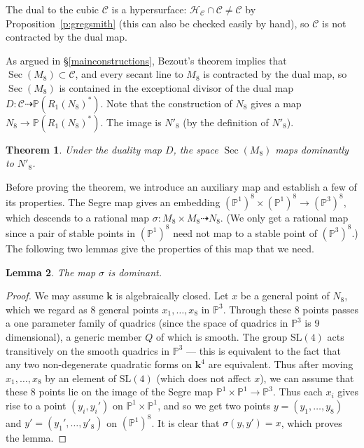 \documentclass{amsart}
\newtheorem{theorem}{Theorem}[section]
\newtheorem{lemma}[theorem]{Lemma}
\theoremstyle{definition}
\theoremstyle{remark}
\DeclareMathOperator{\Sec}{Sec}
\def\SL{\mathrm{SL}}
\def\fieldk{\mathbf{k}}
\def\P{\mathbb{P}}
\def\proj{\mathbb{P}}
\def\cubic{\mathcal{C}}
\def\hessian{\mathcal{H}}
\begin{document}
The dual to the cubic $\cubic$ is a hypersurface:  $\hessian_{\cubic} \cap \cubic \neq \cubic$ by
Proposition~\ref{p:gregsmith} (this can also be checked  easily by hand), so $\cubic$ is not contracted by the dual
map.

As argued in \S \ref{mainconstructions}, Bezout's theorem implies that $\Sec(M_8) \subset \cubic$, and every secant
line to $M_8$ is contracted by the dual map, so $\Sec(M_8)$ is contained in the exceptional divisor of the dual map
$D: \cubic \dashrightarrow \proj(R_1(N_8)^*)$.  Note that the construction of $N_8$ gives a map 
$N_8 \to \proj(R_1(N_8)^*)$.  The image is $N'_8$ (by the definition of $N'_8$).

\begin{theorem}
\label{t:cooltheorem}
Under the duality map $D$, the space $\Sec(M_8)$ maps dominantly to $N'_8$.
\end{theorem}

Before proving the theorem, we introduce an auxiliary map and establish a few of its properties.  The Segre map gives
an embedding $(\P^1)^8 \times (\P^1)^8 \to (\P^3)^8$, which descends to a rational map $\sigma:M_8 \times M_8 \dashrightarrow N_8$.
(We only get a rational map since a pair of stable points in $(\P^1)^8$ need not map to a stable point of
$(\P^3)^8$.)  The following two lemmas give the properties of this map that we need.

\begin{lemma}
The map $\sigma$ is dominant.  
\end{lemma}

\begin{proof}
We may assume $\fieldk$ is algebraically closed.
Let $x$ be a general point of $N_8$, which we regard as 8 general points $x_1, \ldots, x_8$ in $\P^3$.  Through these 8
points passes a one parameter family of quadrics (since the space of quadrics in $\P^3$ is 9 dimensional), a
generic member $Q$ of which is smooth.  The group $\SL(4)$ acts
transitively on the smooth quadrics in $\P^3$ --- this is equivalent to the fact that any two non-degenerate quadratic
forms on $\fieldk^4$ are equivalent.  Thus after moving $x_1, \ldots, x_8$ by an element of $\SL(4)$ (which does not
affect $x$), we can assume that these 8 points lie on the image of the Segre map $\P^1 \times \P^1 \to \P^3$.  Thus
each $x_i$ gives rise to a point $(y_i, y_i')$ on $\P^1 \times \P^1$, and so we get two points $y=(y_1,\ldots,y_8)$
and $y'=(y_1',\ldots,y'_8)$ on $(\P^1)^8$.  It is clear that $\sigma(y,y')=x$, which proves the lemma.
\end{proof}
\end{document}
